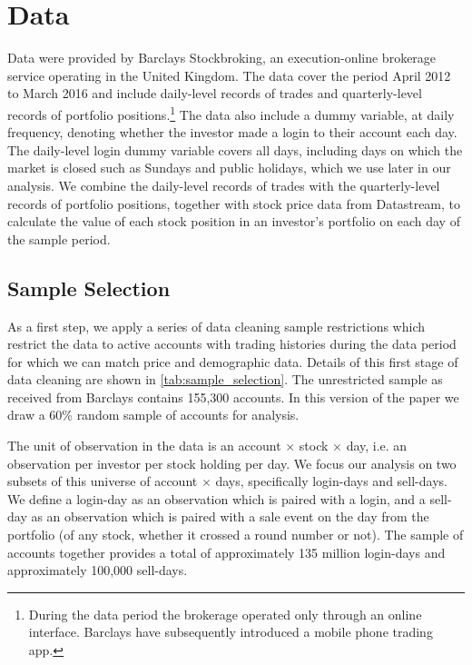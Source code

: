 \section{Data}\label{sec:data}

Data were provided by Barclays Stockbroking, an execution-online brokerage service operating in the United Kingdom. The data cover the period April 2012 to March 2016 and include daily-level records of trades and quarterly-level records of portfolio positions.\footnote{During the data period the brokerage operated only through an online interface. Barclays have subsequently introduced a mobile phone trading app.} The data also include a dummy variable, at daily frequency, denoting whether the investor made a login to their account each day. The daily-level login dummy variable covers all days, including days on which the market is closed such as Sundays and public holidays, which we use later in our analysis. We combine the daily-level records of trades with the quarterly-level records of portfolio positions, together with stock price data from Datastream, to calculate the value of each stock position in an investor's portfolio on each day of the sample period.

\subsection{Sample Selection}

As a first step, we apply a series of data cleaning sample restrictions which restrict the data to active accounts with trading histories during the data period for which we can match price and demographic data. Details of this first stage of data cleaning are shown in \ref{tab:sample_selection}. The unrestricted sample as received from Barclays contains 155,300 accounts. In this version of the paper we draw a 60\% random sample of accounts for analysis. 

The unit of observation in the data is an account $\times$ stock $\times$ day, i.e. an observation per investor per stock holding per day. We focus our analysis on two subsets of this universe of account $\times$ days, specifically login-days and sell-days. We define a login-day as an observation which is paired with a login, and a sell-day as an observation which is paired with a sale event on the day from the portfolio (of any stock, whether it crossed a round number or not). The sample of accounts together provides a total of approximately 135 million login-days and approximately 100,000 sell-days.

